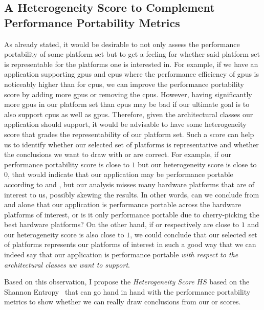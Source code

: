 \subsection{A Heterogeneity Score to Complement Performance Portability Metrics}
\label{sec:heterogeneity_score}

As \citet{yokota_beginners_2018} already stated, it would be desirable to not only assess the performance portability of some platform set but to get a feeling for whether said platform set is representable for the platforms one is interested in. 
For example, if we have an application supporting \glspl{gpu} and \glspl{cpu} where the performance efficiency of \glspl{gpu} is noticeably higher than for \glspl{cpu}, we can improve the performance portability score by adding more \glspl{gpu} or removing the \glspl{cpu}. 
However, having significantly more \glspl{gpu} in our platform set than \glspl{cpu} may be bad if our ultimate goal is to also support \glspl{cpu} as well as \glspl{gpu}. 
Therefore, given the architectural classes our application should support, it would be advisable to have some heterogeneity score that grades the representability of our platform set. 
Such a score can help us to identify whether our selected set of platforms is representative and whether the conclusions we want to draw with \pp or \mpp are correct. 
For example, if our performance portability score is close to $1$ but our heterogeneity score is close to $0$, that would indicate that our application may be performance portable according to \pp and \mpp, but our analysis misses many hardware platforms that are of interest to us, possibly skewing the results. 
In other words, can we conclude from \pp and \mpp alone that our application is performance portable across the hardware platforms of interest, or is it only performance portable due to cherry-picking the best hardware platforms? 
On the other hand, if \pp or \mpp respectively are close to $1$ and our heterogeneity score is also close to $1$, we could conclude that our selected set of platforms represents our platforms of interest in such a good way that we can indeed say that our application is performance portable \textit{with respect to the architectural classes we want to support}.

Based on this observation, I propose the \textit{Heterogeneity Score} $HS$ based on the Shannon Entropy~\cite{shannon_mathematical_1948} that can go hand in hand with the performance portability metrics to show whether we can really draw conclusions from our \pp or \mpp scores. 

